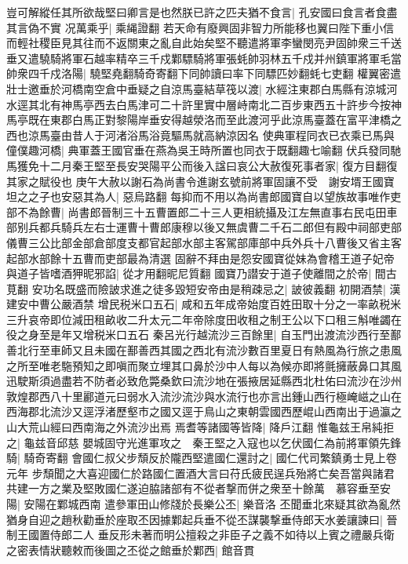 豈可解縱任其所欲哉堅曰卿言是也然朕已許之匹夫猶不食言|{
	孔安國曰食言者食盡其言偽不實}
况萬乘乎|{
	乘䋲證翻}
若天命有廢興固非智力所能移也翼曰陛下重小信而輕社稷臣見其往而不返關東之亂自此始矣堅不聽遣將軍李蠻閔亮尹固帥衆三千送垂又遣驍騎將軍石越率精卒三千戍鄴驃騎將軍張蚝帥羽林五千戍并州鎮軍將軍毛當帥衆四千戍洛陽|{
	驍堅堯翻騎奇寄翻下同帥讀曰率下同驃匹妙翻蚝七吏翻}
權翼密遣壯士邀垂於河橋南空倉中垂疑之自涼馬臺結草筏以渡|{
	水經注東郡白馬縣有涼城河水逕其北有神馬亭西去白馬津可二十許里實中層峙南北二百步東西五十許步今按神馬亭既在東郡白馬正對黎陽岸垂安得越滎洛而至此渡河乎此涼馬臺蓋在富平津橋之西也涼馬臺由昔人于河渚浴馬浴竟驅馬就高納涼因名}
使典軍程同衣已衣乘已馬與僮僕趣河橋|{
	典軍蓋王國官垂在燕為吳王時所置也同衣于既翻趣七喻翻}
伏兵發同馳馬獲免十二月秦王堅至長安哭陽平公而後入諡曰哀公大赦復死事者家|{
	復方目翻復其家之賦役也}
庚午大赦以謝石為尚書令進謝玄號前將軍固讓不受　謝安壻王國寶坦之之子也安惡其為人|{
	惡烏路翻}
每抑而不用以為尚書郎國寶自以望族故事唯作吏部不為餘曹|{
	尚書郎晉制三十五曹置郎二十三人更相統攝及江左無直事右民屯田車部别兵都兵騎兵左右士運曹十曹郎康穆以後又無虞曹二千石二郎但有殿中祠部吏部儀曹三公比部金部倉部度支都官起部水部主客駕部庫部中兵外兵十八曹後又省主客起部水部餘十五曹而吏部最為清選}
固辭不拜由是怨安國寶從妹為會稽王道子妃帝與道子皆嗜酒狎昵邪諂|{
	從才用翻昵尼質翻}
國寶乃譛安于道子使離間之於帝|{
	間古莧翻}
安功名既盛而險詖求進之徒多毀短安帝由是稍疎忌之|{
	詖彼義翻}
初開酒禁|{
	漢建安中曹公嚴酒禁}
增民税米口五石|{
	咸和五年成帝始度百姓田取十分之一率畝税米三升哀帝即位減田租畝收二升太元二年帝除度田收租之制王公以下口租三斛唯蠲在役之身至是年又增税米口五石}
秦呂光行越流沙三百餘里|{
	自玉門出渡流沙西行至鄯善北行至車師又且未國在鄯善西其國之西北有流沙數百里夏日有熱風為行旅之患風之所至唯老駞預知之即嗔而聚立埋其口鼻於沙中人每以為候亦即將氈擁蔽鼻口其風迅駛斯須過盡若不防者必致危斃桑欽曰流沙地在張掖居延縣西北杜佑曰流沙在沙州敦煌郡西八十里酈道元曰弱水入流沙流沙與水流行也亦言出鍾山西行極崦嵫之山在西海郡北流沙又逕浮渚歷壑市之國又逕于鳥山之東朝雲國西歷崐山西南出于過瀛之山大荒山經曰西南海之外流沙出焉}
焉耆等諸國等皆降|{
	降戶江翻}
惟龜兹王帛純拒之|{
	龜兹音邱慈}
嬰城固守光進軍攻之　秦王堅之入寇也以乞伏國仁為前將軍領先鋒騎|{
	騎奇寄翻}
會國仁叔父步頹反於隴西堅遣國仁還討之|{
	國仁代司繁鎮勇士見上卷元年}
步頹聞之大喜迎國仁於路國仁置酒大言曰苻氏疲民逞兵殆將亡矣吾當與諸君共建一方之業及堅敗國仁遂迫脇諸部有不從者撃而併之衆至十餘萬　慕容垂至安陽|{
	安陽在鄴城西南}
遣參軍田山修牋於長樂公丕|{
	樂音洛}
丕聞垂北來疑其欲為亂然猶身自迎之趙秋勸垂於座取丕因據鄴起兵垂不從丕謀襲撃垂侍郎天水姜讓諫曰|{
	晉制王國置侍郎二人}
垂反形未著而明公擅殺之非臣子之義不如待以上賓之禮嚴兵衛之密表情狀聽敕而後圖之丕從之館垂於鄴西|{
	館音貫}

